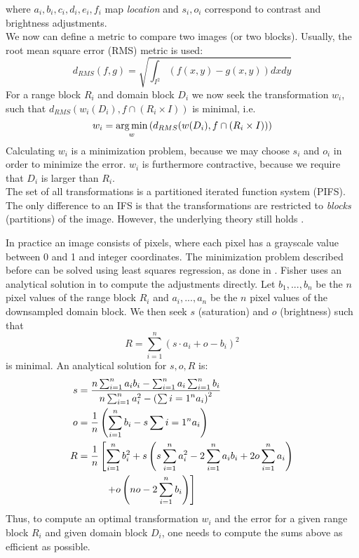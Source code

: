 where $a_i, b_i, c_i, d_i, e_i, f_i$ map \textit{location} and $s_i, o_i$ correspond to contrast and brightness adjustments.
\\
We now can define a metric to compare two images (or two blocks). Usually, the root mean square error (RMS) metric is used:
$$
d_{RMS}(f,g) = \sqrt{\int_{I^2} (f(x,y)-g(x,y))dxdy}
$$
For a range block $R_i$ and domain block $D_i$ we now seek the transformation $w_i$, such that $d_{RMS}(w_i(D_i), f \cap (R_i \times I))$ is minimal, i.e.
$$
    w_i = \operatorname*{arg\,min}_{w} \left( d_{RMS}(w(D_i), f \cap (R_i \times I)) \right)
$$
Calculating $w_i$ is a minimization problem, because we may choose $s_i$ and $o_i$ in order to minimize the error.
$w_i$ is furthermore contractive, because we require that $D_i$ is larger than $R_i$.\\
The set of all transformations is a partitioned iterated function system (PIFS). The only difference to an IFS is that the transformations are restricted
to \textit{blocks} (partitions) of the image. However, the underlying theory still holds \cite{fisher2012}.

In practice an image consists of pixels, where each pixel has a grayscale value between 0 and 1 and integer coordinates.
The minimization problem described before can be solved using least squares regression, as done in \cite{github-python}.
Fisher uses an analytical solution in \cite{fisher2012} to compute the adjustments directly. Let $b_1, ..., b_n$ be the $n$ pixel values of the range block $R_i$
and $a_i,...,a_n$ be the $n$ pixel values of the downsampled domain block. We then seek $s$ (saturation) and $o$ (brightness) such that
$$
R = \sum_{i=1}^n (s \cdot a_i + o - b_i)^2
$$
is minimal. An analytical solution for $s,o,R$ is:
\begin{align*}
    s &= \frac{n \sum_{i=1}^n a_i b_i - \sum_{i=1}^n a_i \sum_{i=1}^n b_i}{n \sum_{i=1}^n a_i^2 - \left(\sum{i=1}^n a_i \right)^2} \\
    o &= \frac{1}{n} \left( \sum_{i=1}^n b_i - s \sum_{}{i=1}^n a_i \right) \\
    R &= \frac{1}{n} \left[ \sum_{i=1}^n b_i^2 + s \left( s \sum_{i=1}^n a_i^2 - 2 \sum_{i=1}^n a_i b_i + 2o \sum_{i=1}^n a_i \right) \right. \\
    &\text{\hspace{1cm}} \left. + o \left(no - 2 \sum_{i=1}^n b_i \right)  \right]
    \end{align*}
Thus, to compute an optimal transformation $w_i$ and the error for a given range block $R_i$ and given domain block $D_i$, one needs to compute the sums above
as efficient as possible.

